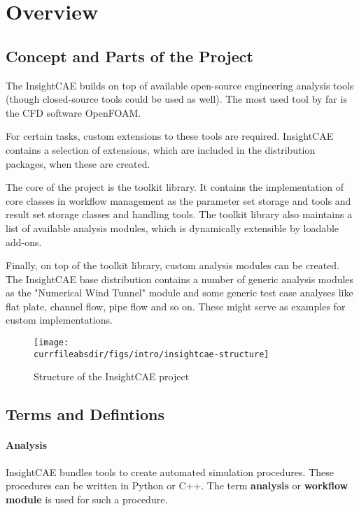\section{Overview}

\subsection{Concept and Parts of the Project}

The InsightCAE builds on top of available open-source engineering analysis tools (though closed-source tools could be used as well). The most used tool by far is the CFD software OpenFOAM.

For certain tasks, custom extensions to these tools are required. InsightCAE contains a selection of extensions, which are included in the distribution packages, when these are created.

The core of the project is the toolkit library. It contains the implementation of core classes in workflow management as the parameter set storage and tools and result set storage classes and handling tools.
The toolkit library also maintains a list of available analysis modules, which is dynamically extensible by loadable add-ons.

Finally, on top of the toolkit library, custom analysis modules can be created.
The InsightCAE base distribution contains a number of generic analysis modules as the "Numerical Wind Tunnel" module and some generic test case analyses like flat plate, channel flow, pipe flow and so on. These might serve as examples for custom implementations.


\begin{figure}[h!]
\centering
\texttt{[image: \\currfileabsdir/figs/intro/insightcae-structure]}
\caption{Structure of the InsightCAE project}
\label{fig:insightcae-structure}
\end{figure}


\subsection{Terms and Defintions}

\paragraph{Analysis}

InsightCAE bundles tools to create automated simulation procedures. These procedures can be written in Python or C++. The term \textbf{analysis} or \textbf{workflow module} is used for such a procedure.

